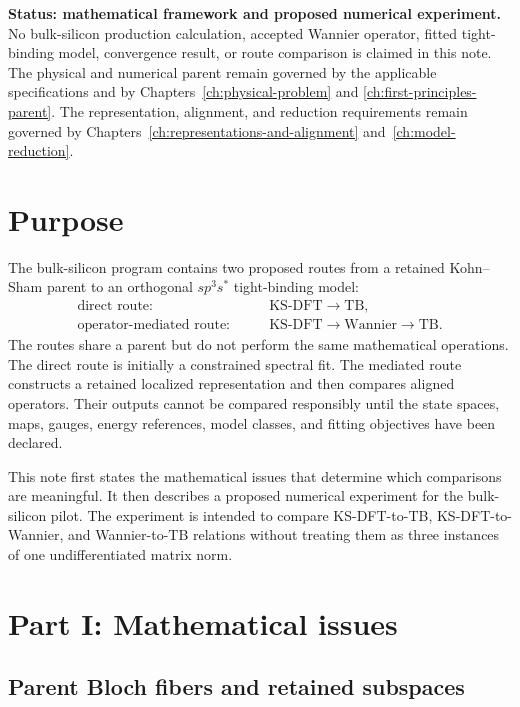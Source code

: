 
\textbf{Status: mathematical framework and proposed numerical experiment.} No
bulk-silicon production calculation, accepted Wannier operator, fitted
tight-binding model, convergence result, or route comparison is claimed in
this note. The physical and numerical parent remain governed by the applicable
specifications and by Chapters~\ref{ch:physical-problem} and
\ref{ch:first-principles-parent}. The representation, alignment, and reduction
requirements remain governed by Chapters~\ref{ch:representations-and-alignment}
and~\ref{ch:model-reduction}.

\section*{Purpose}

The bulk-silicon program contains two proposed routes from a retained
Kohn--Sham parent to an orthogonal $sp^3s^{\ast}$ tight-binding model:
\begin{align}
    \text{direct route:}\qquad
    &\mathrm{KS\text{-}DFT}
    \longrightarrow
    \mathrm{TB},
    \\
    \text{operator-mediated route:}\qquad
    &\mathrm{KS\text{-}DFT}
    \longrightarrow
    \mathrm{Wannier}
    \longrightarrow
    \mathrm{TB}.
\end{align}
The routes share a parent but do not perform the same mathematical operations.
The direct route is initially a constrained spectral fit. The mediated route
constructs a retained localized representation and then compares aligned
operators. Their outputs cannot be compared responsibly until the state
spaces, maps, gauges, energy references, model classes, and fitting objectives
have been declared.

This note first states the mathematical issues that determine which
comparisons are meaningful. It then describes a proposed numerical experiment
for the bulk-silicon pilot. The experiment is intended to compare
KS-DFT-to-TB, KS-DFT-to-Wannier, and Wannier-to-TB relations without treating
them as three instances of one undifferentiated matrix norm.

\section*{Part I: Mathematical issues}

\subsection*{Parent Bloch fibers and retained subspaces}

